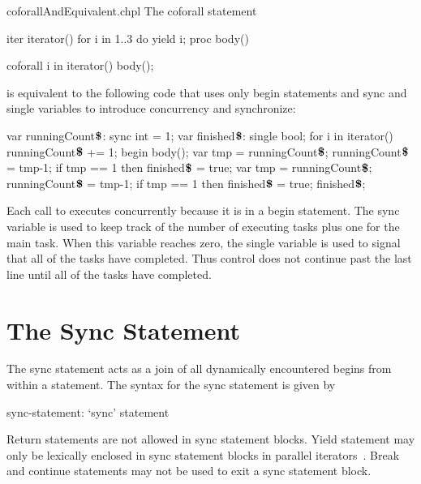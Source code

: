 \begin{chapelexample}{coforallAndEquivalent.chpl}
The coforall statement
\begin{chapelpre}
iter iterator() { for i in 1..3 do yield i; }
proc body() { }
\end{chapelpre}
\begin{chapel}
coforall i in iterator() {
  body();
}
\end{chapel}
is equivalent to the following code that uses only begin statements
and sync and single variables to introduce concurrency and
synchronize:
\begin{chapel}
var runningCount$\mbox{{\bf \$}}$: sync int = 1;
var finished$\mbox{{\bf \$}}$: single bool;
for i in iterator() {
  runningCount$\mbox{{\bf \$}}$ += 1;
  begin {
    body();
    var tmp = runningCount$\mbox{{\bf \$}}$;
    runningCount$\mbox{{\bf \$}}$ = tmp-1;
    if tmp == 1 then finished$\mbox{{\bf \$}}$ = true;
  }
}
var tmp = runningCount$\mbox{{\bf \$}}$;
runningCount$\mbox{{\bf \$}}$ = tmp-1;
if tmp == 1 then finished$\mbox{{\bf \$}}$ = true;
finished$\mbox{{\bf \$}}$;
\end{chapel}
\begin{chapeloutput}
\end{chapeloutput}
Each call to  executes concurrently because it is in a
begin statement.  The sync
variable  is used to keep track of
the number of executing tasks plus one for the main task.  When this
variable reaches zero, the single
variable  is used to signal that all
of the tasks have completed.  Thus control does not continue past the
last line until all of the tasks have completed.
\end{chapelexample}

\section{The Sync Statement}
\label{Sync_Statement}

The sync statement acts as a join of all dynamically encountered
begins from within a statement.  The syntax for the sync statement is
given by
\begin{syntax}
sync-statement:
  `sync' statement
\end{syntax}

Return statements are not allowed in sync statement blocks.  Yield
statement may only be lexically enclosed in sync statement blocks in
parallel iterators~.  Break and continue
statements may not be used to exit a sync statement block.

